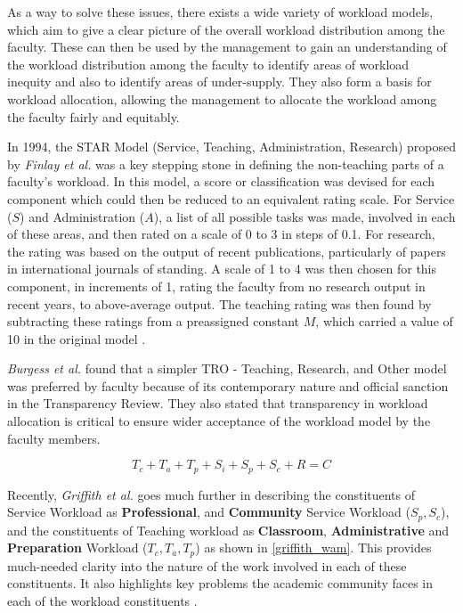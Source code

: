 As a way to solve these issues, there exists a wide variety of workload models, which aim to give a clear picture of the overall workload distribution among the faculty. These can then be used by the management to gain an understanding of the workload distribution among the faculty to identify areas of workload inequity and also to identify areas of under-supply. They also form a basis for workload allocation, allowing the management to allocate the workload among the faculty fairly and equitably.

In 1994, the STAR Model (Service, Teaching, Administration, Research) proposed by \textit{Finlay et al.} was a key stepping stone in defining the non-teaching parts of a faculty's workload. In this model, a score or classification was devised for each component which could then be reduced to an equivalent rating scale. For Service ($S$) and Administration ($A$), a list of all possible tasks was made, involved in each of these areas, and then rated on a scale of 0 to 3 in steps of 0.1. For research, the rating was based on the output of recent publications, particularly of papers in international journals of standing. A scale of 1 to 4 was then chosen for this component, in increments of 1, rating the faculty from no research output in recent years, to above-average output. The teaching rating was then found by subtracting these ratings from a preassigned constant $M$, which carried a value of 10 in the original model \cite{finlay1994management}.

\textit{Burgess et al.} found that a simpler TRO - Teaching, Research, and Other model was preferred by faculty because of its contemporary nature and official sanction in the Transparency Review. They also stated that transparency in workload allocation is critical to ensure wider acceptance of the workload model by the faculty members. \cite{burgess2003academic}


\begin{equation}
  T_c + T_a + T_p + S_i + S_p + S_c+R = C
  \label{griffith_wam}
\end{equation}

Recently, \textit{Griffith et al.} goes much further in describing the constituents of Service Workload as \textbf{Professional}, and \textbf{Community} Service Workload (\(S_p, S_c\)), and the constituents of Teaching workload as \textbf{Classroom}, \textbf{Administrative} and \textbf{Preparation} Workload ($T_c, T_a, T_p$) as shown in \autoref{griffith_wam}. This provides much-needed clarity into the nature of the work involved in each of these constituents. It also highlights key problems the academic community faces in each of the workload constituents \cite{griffith2020framework}.

